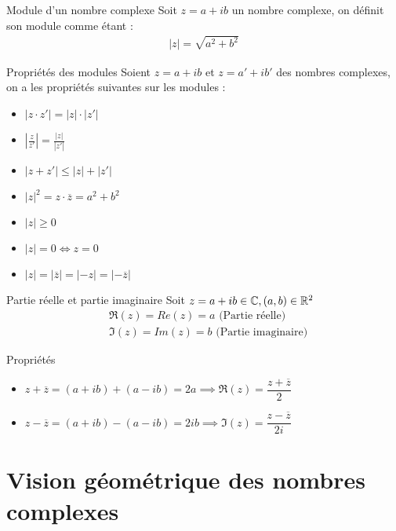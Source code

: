 \begin{definition}{Module d'un nombre complexe}
    Soit $z = a + ib$ un nombre complexe, on définit son module comme étant :
    \begin{align*}
        |z| = \sqrt{a^2 + b^2}
    \end{align*}
\end{definition}

\begin{proposition}{Propriétés des modules}
    Soient $z = a + ib$ et $z = a' + ib'$ des nombres complexes, on a les propriétés suivantes sur les modules :
    \begin{itemize}
        \item $|z \cdot z'| = |z| \cdot |z'|$
        \item $\left| \frac{z}{z'} \right| = \frac{|z|}{|z'|}$
        \item $|z + z'| \leq |z| + |z'|$
        \item $|z|^2 = z \cdot \overline{z} = a^2 + b^2$
        \item $|z| \geq 0$
        \item $|z| = 0 \iff z = 0$
        \item $|z| = |\overline{z}| = |-z| = |-\overline{z}|$
    \end{itemize}
\end{proposition}

\begin{definition}{Partie réelle et partie imaginaire}
    Soit $z = a + ib \in \mathbb{C}, (a, b) \in \mathbb{R}^2$
    \begin{align*}
        &\Re(z) = Re(z) = a \text{ (Partie réelle)} \\
        &\Im(z) = Im(z) = b \text{ (Partie imaginaire)}
    \end{align*}
\end{definition}

\begin{proposition}{Propriétés}
    \begin{itemize}
        \item $z + \overline{z} = (a + ib) + (a - ib) = 2a \implies \Re(z) = \dfrac{z + \overline{z}}{2}$
        \item $z - \overline{z} = (a + ib) - (a - ib) = 2ib \implies \Im(z) = \dfrac{z - \overline{z}}{2i}$
    \end{itemize}
\end{proposition}

\section{Vision géométrique des nombres complexes}

